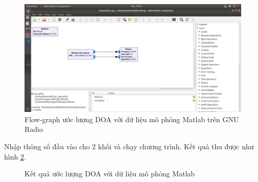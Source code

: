 {\begin{figure} [!hb]
	\centering
	\includegraphics[width=1\linewidth]{figures/simulation1.png}
	\caption{Flow-graph ước lượng DOA với dữ liệu mô phỏng Matlab trên GNU Radio}
	\label{fig:simulation1}
\end{figure}

Nhập thông số đầu vào cho 2 khối và chạy chương trình. Kết quả thu được như hình \ref{fig:simulation2}.

\begin{figure}[h]
{}
\hfill
{}
\hfill
\caption{Kết quả ước lượng DOA với dữ liệu mô phỏng Matlab}
\label{fig:simulation2}
\end{figure}

}
